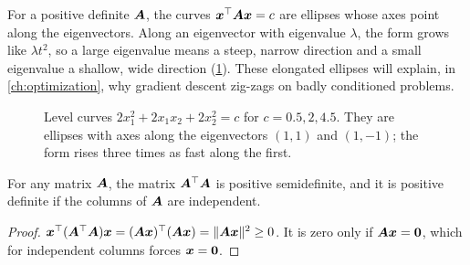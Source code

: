 \begin{intuition}
For a positive definite $\bm{A}$, the curves $\bm{x}^\top\bm{A}\bm{x} = c$ are ellipses
whose axes point along the eigenvectors. Along an eigenvector with eigenvalue
$\lambda$, the form grows like $\lambda t^2$, so a large eigenvalue means a
steep, narrow direction and a small eigenvalue a shallow, wide direction
(\cref{fig:pd-contours}). These elongated ellipses will explain, in
\cref{ch:optimization}, why gradient descent zig-zags on badly conditioned
problems.
\end{intuition}

\begin{figure}[htbp]
\centering
{}
\caption{Level curves $2x_1^2 + 2x_1x_2 + 2x_2^2 = c$ for $c = 0.5, 2, 4.5$.
  They are ellipses with axes along the eigenvectors $(1,1)$ and $(1,-1)$;
  the form rises three times as fast along the first.}
\label{fig:pd-contours}
\end{figure}

\begin{proposition}\label{prop:ata-psd}
For any matrix $\bm{A}$, the matrix $\bm{A}^\top\bm{A}$ is positive semidefinite, and it
is positive definite if the columns of $\bm{A}$ are independent.
\end{proposition}

\begin{proof}
$\bm{x}^\top(\bm{A}^\top\bm{A})\bm{x} = (\bm{A}\bm{x})^\top(\bm{A}\bm{x}) = \lVert\bm{A}\bm{x}\rVert^2 \ge 0$. It is
zero only if $\bm{A}\bm{x} = \bm{0}$, which for independent columns forces
$\bm{x} = \bm{0}$.
\end{proof}


